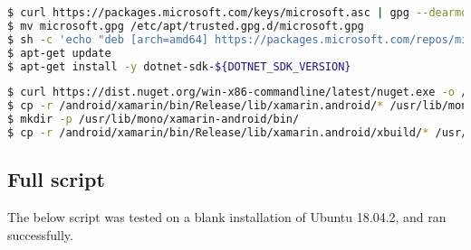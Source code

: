 \begin{lstlisting}[language=bash]
$ curl https://packages.microsoft.com/keys/microsoft.asc | gpg --dearmor > microsoft.gpg
$ mv microsoft.gpg /etc/apt/trusted.gpg.d/microsoft.gpg
$ sh -c 'echo "deb [arch=amd64] https://packages.microsoft.com/repos/microsoft-ubuntu-bionic-prod bionic main" > /etc/apt/sources.list.d/dotnetdev.list'
$ apt-get update
$ apt-get install -y dotnet-sdk-${DOTNET_SDK_VERSION}
\end{lstlisting}

\begin{lstlisting}[language=bash]
$ curl https://dist.nuget.org/win-x86-commandline/latest/nuget.exe -o /nuget.exe
$ cp -r /android/xamarin/bin/Release/lib/xamarin.android/* /usr/lib/mono/
$ mkdir -p /usr/lib/mono/xamarin-android/bin/
$ cp -r /android/xamarin/bin/Release/lib/xamarin.android/xbuild/* /usr/share/dotnet/sdk/${DOTNET_SDK_VERSION}
\end{lstlisting}

\subsection{Full script}

The below script was tested on a blank installation of Ubuntu 18.04.2,
and ran successfully.


